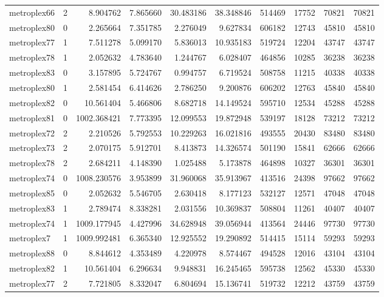 \begin{longtable}{|l|r|r|r|r|r|r|r|r|r|}
metroplex66 & 2 & 8.904762 & 7.865660 & 30.483186 & 38.348846 & 514469 & 17752 & 70821 & 70821 \\
metroplex80 & 0 & 2.265664 & 7.351785 & 2.276049 & 9.627834 & 606182 & 12743 & 45810 & 45810 \\
metroplex77 & 1 & 7.511278 & 5.099170 & 5.836013 & 10.935183 & 519724 & 12204 & 43747 & 43747 \\
metroplex78 & 1 & 2.052632 & 4.783640 & 1.244767 & 6.028407 & 464856 & 10285 & 36238 & 36238 \\
metroplex83 & 0 & 3.157895 & 5.724767 & 0.994757 & 6.719524 & 508758 & 11215 & 40338 & 40338 \\
metroplex80 & 1 & 2.581454 & 6.414626 & 2.786250 & 9.200876 & 606202 & 12763 & 45840 & 45840 \\
metroplex82 & 0 & 10.561404 & 5.466806 & 8.682718 & 14.149524 & 595710 & 12534 & 45288 & 45288 \\
metroplex81 & 0 & 1002.368421 & 7.773395 & 12.099553 & 19.872948 & 539197 & 18128 & 73212 & 73212 \\
metroplex72 & 2 & 2.210526 & 5.792553 & 10.229263 & 16.021816 & 493555 & 20430 & 83480 & 83480 \\
metroplex73 & 2 & 2.070175 & 5.912701 & 8.413873 & 14.326574 & 501190 & 15841 & 62666 & 62666 \\
metroplex78 & 2 & 2.684211 & 4.148390 & 1.025488 & 5.173878 & 464898 & 10327 & 36301 & 36301 \\
metroplex74 & 0 & 1008.230576 & 3.953899 & 31.960068 & 35.913967 & 413516 & 24398 & 97662 & 97662 \\
metroplex85 & 0 & 2.052632 & 5.546705 & 2.630418 & 8.177123 & 532127 & 12571 & 47048 & 47048 \\
metroplex83 & 1 & 2.789474 & 8.338281 & 2.031556 & 10.369837 & 508804 & 11261 & 40407 & 40407 \\
metroplex74 & 1 & 1009.177945 & 4.427996 & 34.628948 & 39.056944 & 413564 & 24446 & 97730 & 97730 \\
metroplex7 & 1 & 1009.992481 & 6.365340 & 12.925552 & 19.290892 & 514415 & 15114 & 59293 & 59293 \\
metroplex88 & 0 & 8.844612 & 4.353489 & 4.220978 & 8.574467 & 494528 & 12016 & 43104 & 43104 \\
metroplex82 & 1 & 10.561404 & 6.296634 & 9.948831 & 16.245465 & 595738 & 12562 & 45330 & 45330 \\
metroplex77 & 2 & 7.721805 & 8.332047 & 6.804694 & 15.136741 & 519732 & 12212 & 43759 & 43759 \\

\end{longtable}
